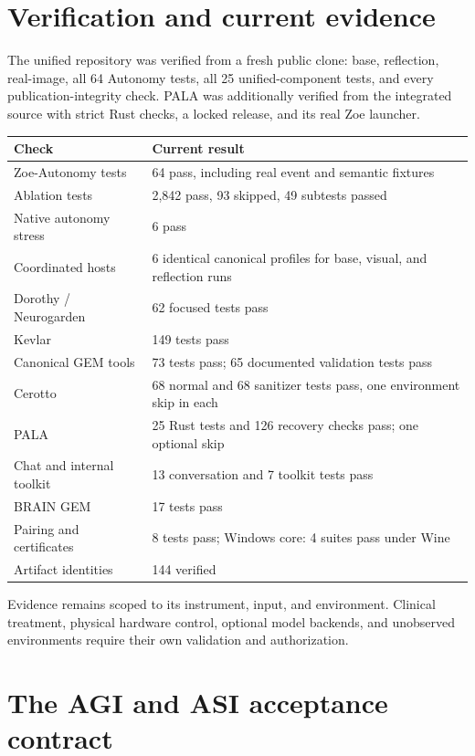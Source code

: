 \documentclass[11pt]{article}
\begin{document}
\clearpage
\section{Verification and current evidence}

The unified repository was verified from a fresh public clone: base, reflection, real-image, all 64 Autonomy tests, all 25 unified-component tests, and every publication-integrity check. PALA was additionally verified from the integrated source with strict Rust checks, a locked release, and its real Zoe launcher.

\begin{longtable}{p{}p{}}
\toprule
\textbf{Check} & \textbf{Current result}\\
\midrule
Zoe-Autonomy tests & 64 pass, including real event and semantic fixtures\\
Ablation tests & 2,842 pass, 93 skipped, 49 subtests passed\\
Native autonomy stress & 6 pass\\
Coordinated hosts & 6 identical canonical profiles for base, visual, and reflection runs\\
Dorothy / Neurogarden & 62 focused tests pass\\
Kevlar & 149 tests pass\\
Canonical GEM tools & 73 tests pass; 65 documented validation tests pass\\
Cerotto & 68 normal and 68 sanitizer tests pass, one environment skip in each\\
PALA & 25 Rust tests and 126 recovery checks pass; one optional skip\\
Chat and internal toolkit & 13 conversation and 7 toolkit tests pass\\
BRAIN GEM & 17 tests pass\\
Pairing and certificates & 8 tests pass; Windows core: 4 suites pass under Wine\\
Artifact identities & 144 verified\\
\bottomrule
\end{longtable}

Evidence remains scoped to its instrument, input, and environment. Clinical treatment, physical hardware control, optional model backends, and unobserved environments require their own validation and authorization.

\clearpage
\section{The AGI and ASI acceptance contract}
\end{document}
